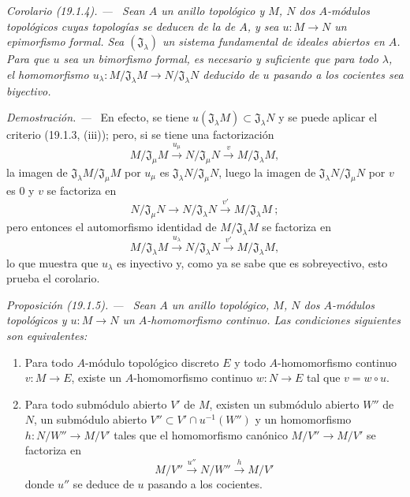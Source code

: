 \documentclass[10pt,oneside]{book}
\makeatletter
\newcommand{\setmanualcurrentlabel}[1]{\def\@currentlabel{#1}}
\newenvironment{proposition}[1][]{%
  \setmanualcurrentlabel{#1}\par\medskip\noindent\itshape Proposición (#1). ---\ }{\par}
\newenvironment{corollary}[1][]{%
  \setmanualcurrentlabel{#1}\par\medskip\noindent\itshape Corolario (#1). ---\ }{\par}
\newenvironment{proof}{%
  \par\medskip\noindent\textit{Demostración. ---\ }}{\par}
\makeatother
\begin{document}
\begin{corollary}[19.1.4]
\label{0.19.1.4-es}
Sean $A$ un anillo topológico y $M$, $N$ dos $A$-módulos topológicos cuyas
topologías se deducen de la de $A$, y sea $u:M\to N$ un epimorfismo
formal. Sea $(\mathfrak J_\lambda)$ un sistema fundamental de ideales abiertos
en $A$. Para que $u$ sea un bimorfismo formal, es necesario y suficiente que para
todo $\lambda$, el homomorfismo
$u_\lambda:M/\mathfrak J_\lambda M\to N/\mathfrak J_\lambda N$ deducido de $u$
pasando a los cocientes sea biyectivo.
\end{corollary}

\begin{proof}
En efecto, se tiene $u(\mathfrak J_\lambda M)\subset\mathfrak J_\lambda N$ y se
puede aplicar el criterio (19.1.3, (iii)); pero, si se tiene una factorización
\[
  M/\mathfrak J_\mu M\xrightarrow{u_\mu}
  N/\mathfrak J_\mu N\xrightarrow{v}M/\mathfrak J_\lambda M,
\]
la imagen de $\mathfrak J_\lambda M/\mathfrak J_\mu M$ por $u_\mu$ es
$\mathfrak J_\lambda N/\mathfrak J_\mu N$, luego la imagen de
$\mathfrak J_\lambda N/\mathfrak J_\mu N$ por $v$ es 0 y $v$ se factoriza en
\[
  N/\mathfrak J_\mu N\longrightarrow N/\mathfrak J_\lambda N
  \xrightarrow{v'}M/\mathfrak J_\lambda M~;
\]
pero entonces el automorfismo identidad de $M/\mathfrak J_\lambda M$ se factoriza
en
\[
  M/\mathfrak J_\lambda M\xrightarrow{u_\lambda}
  N/\mathfrak J_\lambda N\xrightarrow{v'}M/\mathfrak J_\lambda M,
\]
lo que muestra que $u_\lambda$ es inyectivo y, como ya se sabe que es
sobreyectivo, esto prueba el corolario.
\end{proof}

\begin{proposition}[19.1.5]
\label{0.19.1.5-es}
Sean $A$ un anillo topológico, $M$, $N$ dos $A$-módulos topológicos y
$u:M\to N$ un $A$-homomorfismo continuo. Las condiciones siguientes son
equivalentes:
\begin{enumerate}
  \item[\textup{a)}] Para todo $A$-módulo topológico \textup{discreto} $E$ y todo
  $A$-homomorfismo continuo $v:M\to E$, existe un $A$-homomorfismo continuo
  $w:N\to E$ tal que $v=w\circ u$.
  \item[\textup{b)}] Para todo submódulo abierto $V'$ de $M$, existen un submódulo
  abierto $W''$ de $N$, un submódulo abierto
  $V''\subset V'\cap u^{-1}(W'')$ y un homomorfismo
  $h:N/W''\to M/V'$ tales que el homomorfismo canónico
  $M/V''\to M/V'$ se factoriza en
  \[
    M/V''\xrightarrow{u''}N/W''\xrightarrow{h}M/V'
  \]
  donde $u''$ se deduce de $u$ pasando a los cocientes.
\end{enumerate}
\end{proposition}
\end{document}
